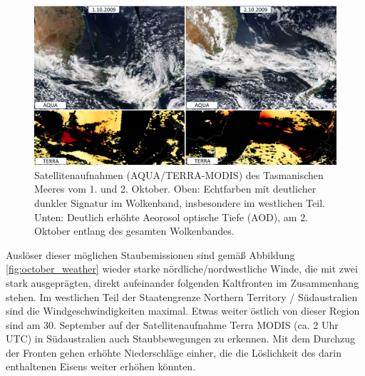 \documentclass[12pt,a4paper,onecolumn,headheight=30pt]{scrartcl}
\begin{document}
\begin{figure}[htbp]
\includegraphics[width=\textwidth]{bilder/satellite_october.png}
\caption{Satellitenaufnahmen (AQUA/TERRA-MODIS) des Tasmanischen Meeres vom 1. und 2. Oktober. Oben: Echtfarben mit deutlicher dunkler Signatur im Wolkenband, insbesondere im westlichen Teil. Unten: Deutlich erhöhte Aeorosol optische Tiefe (AOD), am 2. Oktober entlang des gesamten Wolkenbandes.} \label{fig:satellite_october}
\end{figure}
Auslöser dieser möglichen Staubemissionen sind gemäß Abbildung \ref{fig:october_weather} wieder starke nördliche/nordwestliche Winde, die mit zwei stark ausgeprägten, direkt aufeinander folgenden Kaltfronten im Zusammenhang stehen. Im westlichen Teil der Staatengrenze Northern Territory / Südaustralien sind die Windgeschwindigkeiten maximal. Etwas weiter östlich von dieser Region sind am 30. September auf der Satellitenaufnahme Terra MODIS (ca. 2 Uhr UTC) in Südaustralien auch Staubbewegungen zu erkennen. Mit dem Durchzug der Fronten gehen erhöhte Niederschläge einher, die die Löslichkeit des darin enthaltenen Eisens weiter erhöhen könnten. 
\end{document}
